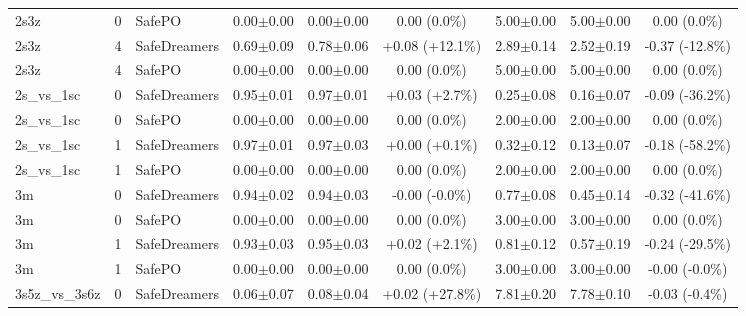\documentclass{article}
\begin{document}
\begin{longtable}{lclcccccc}
2s3z & 0 & SafePO & 0.00$\pm$0.00 & 0.00$\pm$0.00 & \textcolor{red!40!black}{0.00 (0.0\%)} & 5.00$\pm$0.00 & 5.00$\pm$0.00 & \textcolor{green!40!black}{0.00 (0.0\%)} \\
2s3z & 4 & SafeDreamers & 0.69$\pm$0.09 & 0.78$\pm$0.06 & \textcolor{green!55!black}{+0.08 (+12.1\%)} & 2.89$\pm$0.14 & 2.52$\pm$0.19 & \textcolor{green!55!black}{-0.37 (-12.8\%)} \\
2s3z & 4 & SafePO & 0.00$\pm$0.00 & 0.00$\pm$0.00 & \textcolor{red!40!black}{0.00 (0.0\%)} & 5.00$\pm$0.00 & 5.00$\pm$0.00 & \textcolor{green!40!black}{0.00 (0.0\%)} \\
\midrule
2s\_vs\_1sc & 0 & SafeDreamers & 0.95$\pm$0.01 & 0.97$\pm$0.01 & \textcolor{green!40!black}{+0.03 (+2.7\%)} & 0.25$\pm$0.08 & 0.16$\pm$0.07 & \textcolor{green!85!black}{-0.09 (-36.2\%)} \\
2s\_vs\_1sc & 0 & SafePO & 0.00$\pm$0.00 & 0.00$\pm$0.00 & \textcolor{red!40!black}{0.00 (0.0\%)} & 2.00$\pm$0.00 & 2.00$\pm$0.00 & \textcolor{green!40!black}{0.00 (0.0\%)} \\
2s\_vs\_1sc & 1 & SafeDreamers & 0.97$\pm$0.01 & 0.97$\pm$0.03 & \textcolor{green!40!black}{+0.00 (+0.1\%)} & 0.32$\pm$0.12 & 0.13$\pm$0.07 & \textcolor{green!100!black}{-0.18 (-58.2\%)} \\
2s\_vs\_1sc & 1 & SafePO & 0.00$\pm$0.00 & 0.00$\pm$0.00 & \textcolor{red!40!black}{0.00 (0.0\%)} & 2.00$\pm$0.00 & 2.00$\pm$0.00 & \textcolor{green!40!black}{0.00 (0.0\%)} \\
\midrule
3m & 0 & SafeDreamers & 0.94$\pm$0.02 & 0.94$\pm$0.03 & \textcolor{red!40!black}{-0.00 (-0.0\%)} & 0.77$\pm$0.08 & 0.45$\pm$0.14 & \textcolor{green!85!black}{-0.32 (-41.6\%)} \\
3m & 0 & SafePO & 0.00$\pm$0.00 & 0.00$\pm$0.00 & \textcolor{red!40!black}{0.00 (0.0\%)} & 3.00$\pm$0.00 & 3.00$\pm$0.00 & \textcolor{green!40!black}{0.00 (0.0\%)} \\
3m & 1 & SafeDreamers & 0.93$\pm$0.03 & 0.95$\pm$0.03 & \textcolor{green!40!black}{+0.02 (+2.1\%)} & 0.81$\pm$0.12 & 0.57$\pm$0.19 & \textcolor{green!70!black}{-0.24 (-29.5\%)} \\
3m & 1 & SafePO & 0.00$\pm$0.00 & 0.00$\pm$0.00 & \textcolor{red!40!black}{0.00 (0.0\%)} & 3.00$\pm$0.00 & 3.00$\pm$0.00 & \textcolor{green!40!black}{-0.00 (-0.0\%)} \\
\midrule
3s5z\_vs\_3s6z & 0 & SafeDreamers & 0.06$\pm$0.07 & 0.08$\pm$0.04 & \textcolor{green!70!black}{+0.02 (+27.8\%)} & 7.81$\pm$0.20 & 7.78$\pm$0.10 & \textcolor{green!40!black}{-0.03 (-0.4\%)} \\

\end{longtable}
\end{document}
